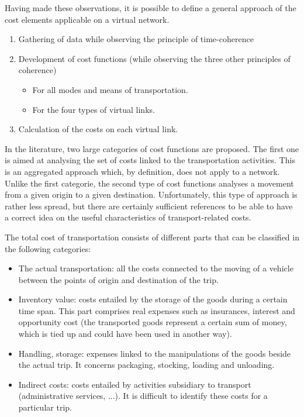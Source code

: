 Having made these observations, it is possible to define a general approach of
the cost elements applicable on a virtual network.


\begin{enumerate}
\item Gathering of data while observing the principle of time-coherence
\item Development of cost functions (while observing the three other
principles of coherence)
        \begin{itemize}
        \item For all modes and means of transportation.
        \item For the four types of virtual links.
        \end{itemize}
\item Calculation of the costs on each virtual link.
\end{enumerate}

In the literature, two large categories of cost functions are
proposed.  The first one is aimed at analysing the set of costs linked to the
transportation activities.  This is an aggregated approach which, by
definition, does not apply to a network.  Unlike the first
categorie, the second type of cost functions analyses a movement from a given
origin to a given destination.  Unfortunately, this type of approach is
rather less spread, but there are certainly sufficient references to be able to
have a correct idea on the useful characteristics of transport-related costs.


The total cost of transportation consists of different parts that can be
classified in the following categories:

\begin{itemize}
\item The actual transportation: all the costs connected to the moving of
a vehicle between the points of origin and destination of the trip.

\item Inventory value: costs entailed by the storage of the goods during a certain
time span.  This part comprises real expenses such as insurances,
interest and opportunity cost (the transported goods represent a certain sum
of money, which is tied up and could have been used in another way).

\item Handling, storage: expenses linked to the manipulations of the goods beside the
actual trip.  It concerns packaging, stocking,
loading and unloading.

\item Indirect costs: costs entailed by activities subsidiary to
transport (administrative services, ...).  It is difficult to identify
these costs for a particular trip.
\end{itemize}

